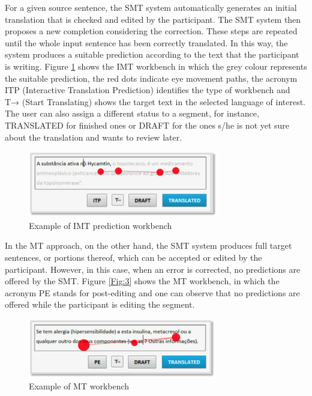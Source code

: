 \documentclass[output=paper]{langsci/langscibook}
\begin{document}
For a given source sentence, the SMT system automatically generates an initial translation that is checked and edited by the participant. The SMT system then proposes a new completion considering the correction. These steps are repeated until the whole input sentence has been correctly translated. In this way, the system produces a suitable prediction according to the text that the participant is writing. Figure \ref{fig:2} shows the IMT workbench in which the grey colour represents the suitable prediction, the red dots indicate eye movement paths, the acronym ITP (Interactive Translation Prediction) identifies the type of workbench and T→ (Start Translating) shows the target text in the selected language of interest. The user can also assign a different status to a segment, for instance, TRANSLATED for finished ones or DRAFT for the ones s/he is not yet sure about the translation and wants to review later.



\begin{figure}
 \includegraphics[width=\textwidth]{figures/Sarto2.png}
 \caption{Example of IMT prediction workbench}
 \label{fig:2}
\end{figure} 


In the MT approach, on the other hand, the SMT system produces full target sentences, or portions thereof, which can be accepted or edited by the participant. However, in this case, when an error is corrected, no predictions are offered by the SMT. Figure  \ref{Fig:3} shows the MT workbench, in which the acronym PE stands for post-editing and one can observe that no predictions are offered while the participant is editing the segment.  



  
\begin{figure}
 \includegraphics[width=\textwidth]{figures/Sarto3.png}
 \caption{Example of MT workbench}
 \label{fig:3}
\end{figure} 
 
\end{document}
